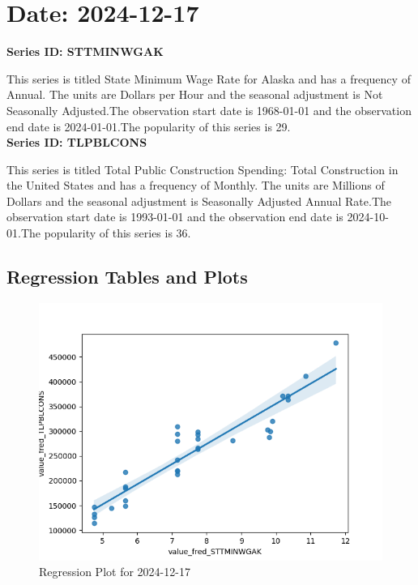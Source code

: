 \section{Date: 2024-12-17}
\noindent \textbf{Series ID: STTMINWGAK} 

\noindent This series is titled State Minimum Wage Rate for Alaska and has a frequency of Annual. The units are Dollars per Hour and the seasonal adjustment is Not Seasonally Adjusted.The observation start date is 1968-01-01 and the observation end date is 2024-01-01.The popularity of this series is 29. \\ 

\noindent \textbf{Series ID: TLPBLCONS} 

\noindent This series is titled Total Public Construction Spending: Total Construction in the United States and has a frequency of Monthly. The units are Millions of Dollars and the seasonal adjustment is Seasonally Adjusted Annual Rate.The observation start date is 1993-01-01 and the observation end date is 2024-10-01.The popularity of this series is 36. \\ 

\subsection{Regression Tables and Plots}


\begin{figure}
\centering
\includegraphics[scale = 0.9]{plots/plot_2024-12-17.png}
\caption{Regression Plot for 2024-12-17}
\end{figure}
\newpage
